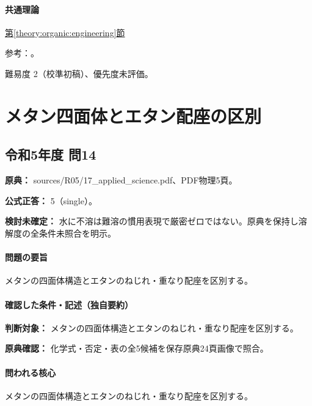 \paragraph{共通理論} \hyperref[theory:organic:engineering]{第\ref*{theory:organic:engineering}節}

\par 参考：\cite{organic_enpla}。

\par 難易度 2（校準初稿）、優先度未評価。

\section{メタン四面体とエタン配座の区別}

\subsection{令和5年度 問14}
\label{q:r05-reg-applied-14}

\noindent\textbf{原典：} sources/R05/17\_applied\_science.pdf、PDF物理5頁。

\textbf{公式正答：} 5（single）。

\par\textbf{検討未確定：} 水に不溶は難溶の慣用表現で厳密ゼロではない。原典を保持し溶解度の全条件未照合を明示。

\paragraph{問題の要旨} メタンの四面体構造とエタンのねじれ・重なり配座を区別する。

\paragraph{確認した条件・記述（独自要約）}\mbox{}\par

\noindent\textbf{判断対象：} メタンの四面体構造とエタンのねじれ・重なり配座を区別する。\par

\noindent\textbf{原典確認：} 化学式・否定・表の全5候補を保存原典24頁画像で照合。\par

\paragraph{問われる核心} メタンの四面体構造とエタンのねじれ・重なり配座を区別する。

